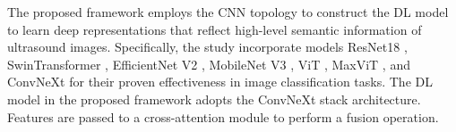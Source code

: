 \documentclass[final,british,a4paper,12pt]{phdthesis}
\begin{document}



The proposed framework employs the CNN topology to construct the DL model to learn deep representations that reflect high-level semantic information of ultrasound images. Specifically, the study incorporate models ResNet18 \cite{resnet}, SwinTransformer \cite{Liu:2022b}, EfficientNet V2 \cite{Tan:2021}, MobileNet V3 \cite{Howard:2019}, ViT \cite{Dosovitskiy:2020_b}, MaxViT \cite{Tu:2022}, and ConvNeXt \cite{Liu:2022} for their proven effectiveness in image classification tasks. %
The DL model in the proposed framework adopts the ConvNeXt stack architecture. Features are passed to a cross-attention module to perform a fusion operation. 


\end{document}
